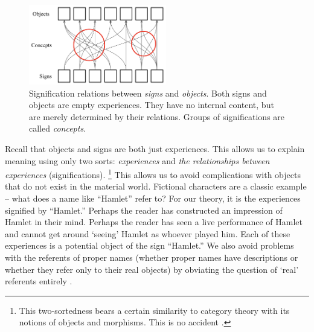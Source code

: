 
\begin{figure}
    \centering
    \includegraphics[width=6cm]{NeurIPS/imgs/sign-concept-object.png}
    \caption{Signification relations between \textit{signs} and \textit{objects}. Both signs and objects are empty experiences. They have no internal content, but are merely determined by their relations. Groups of significations are called \textit{concepts}.}
    \label{fig:enter-label}
\end{figure}

Recall that objects and signs are both just experiences. This allows us to explain meaning using only two sorts: \textit{experiences} and \textit{the relationships between experiences} (significations).
\footnote{This two-sortedness bears a certain similarity to category theory with its notions of objects and morphisms. This is no accident \citep{Tsuchiya:CategoryTheoryNeuroscience}.
}
This allows us to avoid complications with objects that do not exist in the material world.
Fictional characters are a classic example -- what does a name like ``Hamlet'' refer to? For our theory, it is the experiences signified by ``Hamlet.''
Perhaps the reader has constructed an impression of Hamlet in their mind.
Perhaps the reader has seen a live performance of Hamlet and cannot get around `seeing' Hamlet as whoever played him. Each of these experiences is a potential object of the sign ``Hamlet.''
We also avoid problems with the referents of proper names (whether proper names have descriptions or whether they refer only to their real objects) by obviating the question of `real' referents entirely \citep{Kripke:NamingNecessity}.

